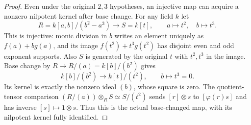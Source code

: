 \begin{proof}
Even under the original $2,3$ hypotheses,
an injective map can acquire a nonzero
nilpotent kernel after base change.
For any field $k$ let
$$
R=k[a,b]/(b^2-a^3)\longrightarrow S=k[t],
\qquad a\longmapsto t^2,\quad b\longmapsto t^3.
$$
This is injective: monic division in
$b$ writes an element uniquely as
$f(a)+b g(a)$, and its image
$f(t^2)+t^3g(t^2)$ has disjoint even
and odd exponent supports. Also $S$
is generated by the original $t$ with
$t^2,t^3$ in the image. Base change
by $R\to R/(a)=k[b]/(b^2)$ gives
$$
k[b]/(b^2)\longrightarrow k[t]/(t^2),
\qquad b\longmapsto t^3=0.
$$
Its kernel is exactly the nonzero
ideal $(b)$, whose square is zero.
The quotient-tensor comparison
$(R/(a))\otimes_R S\simeq S/(t^2)$
sends $[r]\otimes s$ to $[\varphi(r)s]$
and has inverse $[s]\mapsto1\otimes s$.
Thus this is the actual base-changed
map, with its nilpotent kernel fully
identified.
\end{proof}
